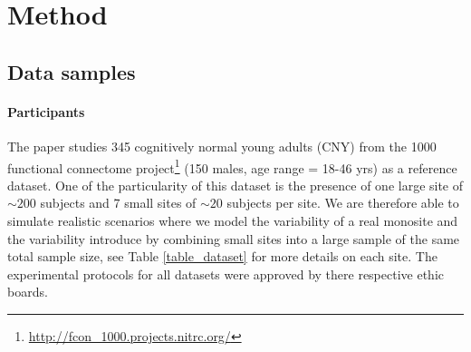 \documentclass[authoryear]{elsarticle}
\begin{document}
\section{Method}

\subsection{Data samples} 

\paragraph{Participants}
The paper studies 345 cognitively normal young adults (CNY) from the 1000 functional connectome project\footnote{\url{http://fcon_1000.projects.nitrc.org/}} (150 males, age range = 18-46 yrs) as a reference dataset. One of the particularity of this dataset is the presence of one large site of $\sim200$ subjects and 7 small sites of $\sim20$ subjects per site. We are therefore able to simulate realistic scenarios where we model the variability of a real monosite and the variability introduce by combining small sites into a large sample of the same total sample size, see Table \ref{table_dataset} for more details on each site. The experimental protocols for all datasets were approved by there respective ethic boards.
\end{document}
